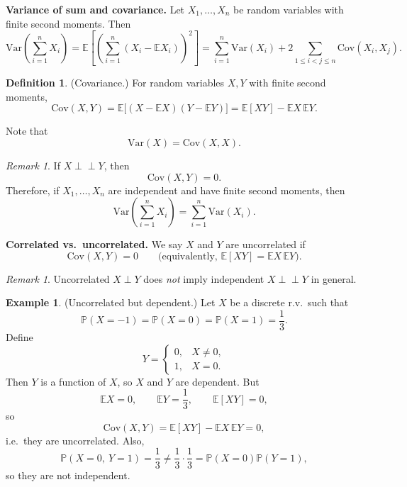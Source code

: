 \documentclass[11pt]{article}
\theoremstyle{plain}
\theoremstyle{definition}
\newtheorem{definition}[theorem]{Definition}
\newtheorem{example}[theorem]{Example}
\theoremstyle{remark}
\newtheorem{remark}[theorem]{Remark}
\begin{document}
	\textbf{Variance of sum and covariance.}
	Let \(X_1,\dots,X_n\) be random variables with finite second moments.
	Then
	\[
	\mathrm{Var}\!\left(\sum_{i=1}^{n} X_i\right)
	=\mathbb{E}\!\left[\left(\sum_{i=1}^{n} (X_i-\mathbb{E}X_i)\right)^2\right]
	=\sum_{i=1}^{n}\mathrm{Var}(X_i)+2\sum_{1\le i<j\le n}\mathrm{Cov}(X_i,X_j).
	\]
	
	\begin{definition}
		(Covariance.)
		For random variables \(X,Y\) with finite second moments,
		\[
		\mathrm{Cov}(X,Y)=\mathbb{E}\big[(X-\mathbb{E}X)(Y-\mathbb{E}Y)\big]
		=\mathbb{E}[XY]-\mathbb{E}X\,\mathbb{E}Y.
		\]
	\end{definition}
	
	Note that
	\[
	\mathrm{Var}(X)=\mathrm{Cov}(X,X).
	\]
	
	\begin{remark}
		If \(X\perp\!\!\!\perp Y\), then
		\[
		\mathrm{Cov}(X,Y)=0.
		\]
		Therefore, if \(X_1,\dots,X_n\) are independent and have finite second moments, then
		\[
		\mathrm{Var}\!\left(\sum_{i=1}^{n} X_i\right)=\sum_{i=1}^{n}\mathrm{Var}(X_i).
		\]
	\end{remark}
	
	\textbf{Correlated vs.\ uncorrelated.}
	We say \(X\) and \(Y\) are uncorrelated if
	\[
	\mathrm{Cov}(X,Y)=0
	\qquad\text{(equivalently, } \mathbb{E}[XY]=\mathbb{E}X\,\mathbb{E}Y\text{)}.
	\]
	
	\begin{remark}
		Uncorrelated $X\perp Y$ does \emph{not} imply independent $X\perp\!\!\!\perp Y$ in general.
	\end{remark}
	
	\begin{example}
		(Uncorrelated but dependent.)
		Let \(X\) be a discrete r.v.\ such that
		\[
		\mathbb{P}(X=-1)=\mathbb{P}(X=0)=\mathbb{P}(X=1)=\frac{1}{3}.
		\]
		Define
		\[
		Y=
		\begin{cases}
			0, & X\ne 0,\\
			1, & X=0.
		\end{cases}
		\]
		Then \(Y\) is a function of \(X\), so \(X\) and \(Y\) are dependent.
		But
		\[
		\mathbb{E}X=0,
		\qquad
		\mathbb{E}Y=\frac{1}{3},
		\qquad
		\mathbb{E}[XY]=0,
		\]
		so
		\[
		\mathrm{Cov}(X,Y)=\mathbb{E}[XY]-\mathbb{E}X\,\mathbb{E}Y=0,
		\]
		i.e.\ they are uncorrelated.
		Also,
		\[
		\mathbb{P}(X=0,\ Y=1)=\frac{1}{3}\ne \frac{1}{3}\cdot\frac{1}{3}=\mathbb{P}(X=0)\mathbb{P}(Y=1),
		\]
		so they are not independent.
	\end{example}
	
\end{document}
